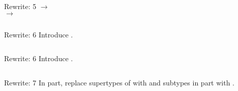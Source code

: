 \begin{frame}{Rewrite: 5}
   $\to$ \\
   $\to$ 

  \begin{columns}
    \begin{column}{0.5\textwidth}
      \usebox\typecaseEbox
    \end{column}
    \begin{column}{0.5\textwidth}  %
      \usebox\typecaseFhbox
    \end{column}    
  \end{columns}
\end{frame}

\begin{frame}{Rewrite: 6}
  Introduce .

  \begin{columns}
    \begin{column}{0.5\textwidth}
      \usebox\typecaseFbox
    \end{column}
    \begin{column}{0.5\textwidth}  %
      \usebox\typecaseGabox
    \end{column}    
  \end{columns}
\end{frame}

\begin{frame}{Rewrite: 6}
  Introduce .

  \begin{columns}
    \begin{column}{0.5\textwidth}
      \usebox\typecaseFbox
    \end{column}
    \begin{column}{0.5\textwidth}  %
      \usebox\typecaseGbox
    \end{column}    
  \end{columns}
\end{frame}

\begin{frame}{Rewrite: 7}
  In  part, replace supertypes of  with  and subtypes in  part with .

  \begin{columns}
    \begin{column}{0.5\textwidth}
      \usebox\typecaseGbox
    \end{column}
    \begin{column}{0.5\textwidth}  %
      \usebox\typecaseHhbox
    \end{column}    
  \end{columns}
\end{frame}


